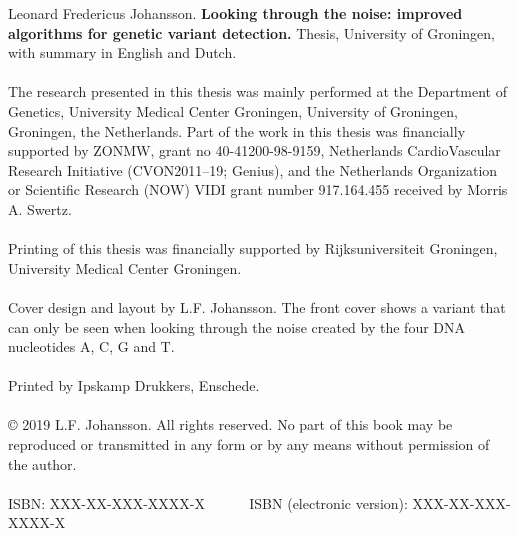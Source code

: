 {\small
\noindent
Leonard Fredericus Johansson. \textbf{Looking through the noise: improved algorithms for genetic variant detection.} Thesis, University of Groningen, with summary in English and Dutch.
\\~\\
The research presented in this thesis was mainly performed at the Department of Genetics, University Medical Center Groningen, University of Groningen, Groningen, the Netherlands. Part of the work in this thesis was financially supported by ZONMW, grant no 40-41200-98-9159, Netherlands CardioVascular Research Initiative (CVON2011–19; Genius), and the Netherlands Organization or Scientific Research (NOW) VIDI grant number 917.164.455 received by Morris A. Swertz. 
\\~\\
Printing of this thesis was financially supported by Rijksuniversiteit Groningen, University Medical Center Groningen. 
\\~\\
Cover design and layout by L.F. Johansson.
The front cover shows a variant that can only be seen when looking through the noise created by the four DNA nucleotides A, C, G and T. 
\\~\\
Printed by Ipskamp Drukkers, Enschede.\\
\\
© 2019 L.F. Johansson. All rights reserved. No part of this book may be reproduced or transmitted in any form or by any means without permission of the author.\\
\\
ISBN: XXX-XX-XXX-XXXX-X \mbox{~~~~~} ISBN (electronic version): XXX-XX-XXX-XXXX-X
}

